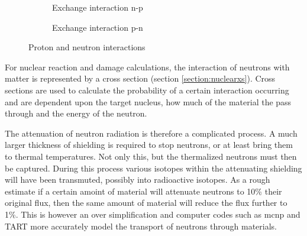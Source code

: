 \begin{figure}[htb]
\begin{subfigure}{.32\textwidth}
\centering
{}
\caption{Exchange interaction n-p\cite{pionexchange}}
\label{fig:pppion}
\end{subfigure}
\begin{subfigure}{.32\textwidth}
\centering
{}
\caption{Exchange interaction p-n\cite{pionexchange}}
\label{fig:pnpion}
\end{subfigure}
\caption{Proton and neutron interactions}
\label{fig:pninteractions}
\end{figure}

For nuclear reaction and damage calculations, the interaction of neutrons with matter is represented by a cross section (section \ref{section:nuclearxs}).  Cross sections are used to calculate the probability of a certain interaction occurring and are dependent upon the target nucleus, how much of the material the pass through and the energy of the neutron.

The attenuation of neutron radiation is therefore a complicated process.  A much larger thickness of shielding is required to stop neutrons, or at least bring them to thermal temperatures.  Not only this, but the thermalized neutrons must then be captured.  During this process various isotopes within the attenuating shielding will have been transmuted, possibly into radioactive isotopes.  As a rough estimate if a certain amoint of material will attenuate neutrons to 10\% their original flux, then the same amount of material will reduce the flux further to 1\%.  This is however an over simplification and computer codes such as \acrfull{mcnp} and TART more accurately model the transport of neutrons through materials. 



